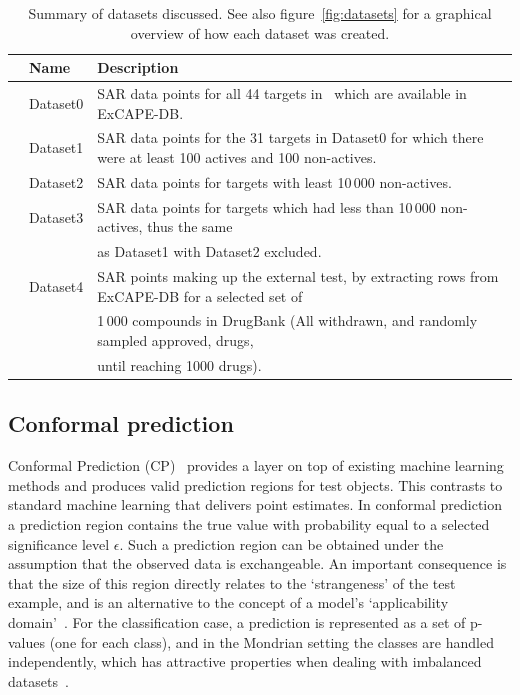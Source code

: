 \documentclass[utf8]{frontiersSCNS} %
\begin{document}
\begin{table}[h]
\small
\centering
\caption{Summary of datasets discussed. See also figure~\ref{fig:datasets}
    for a graphical overview of how each dataset was created.}
\label{tbl:datasets}
\renewcommand{\arraystretch}{1.4}
\begin{tabular}{rlp{}}
\toprule
& Name     & Description \\
\midrule
& Dataset0 & SAR data points for all 44 targets in~\cite{Bowes2012} which are available in ExCAPE-DB. \\
& Dataset1 & SAR data points for the 31 targets in Dataset0 for which there were at least 100 actives and 100 non-actives. \\
& Dataset2 & SAR data points for targets with least 10\,000 non-actives. \\
& Dataset3 & SAR data points for targets which had less than 10\,000 non-actives, thus the same \\
&          & as Dataset1 with Dataset2 excluded. \\
& Dataset4 & SAR points making up the external test, by extracting rows from ExCAPE-DB for a selected set of \\
&          & 1\,000 compounds in DrugBank (All withdrawn, and randomly sampled approved, drugs,\\
&          & until reaching 1000 drugs). \\
\bottomrule
\end{tabular}
\renewcommand{\arraystretch}{1}
\end{table}

\subsection{Conformal prediction}
Conformal Prediction (CP)~\cite{Vovk2005} provides a layer on top of
existing machine learning methods and produces valid prediction regions for test
objects. This contrasts to standard machine learning that delivers point
estimates. In conformal prediction a prediction region contains the true
value with probability equal to a selected significance level $\epsilon$. Such
a prediction region can be obtained under the assumption that the observed data
is exchangeable. An important consequence is that the size of this region directly
relates to the `strangeness' of the test example, and is an alternative to the
concept of a model's `applicability domain'~\cite{Norinder:2014fe}. For
the classification case, a prediction is represented as a set of p-values (one for each
class), and in the Mondrian setting the classes are handled independently,
which has attractive properties when dealing with imbalanced
datasets~\cite{Norinder:2017qc,Sun:2017qm}. 
\end{document}
